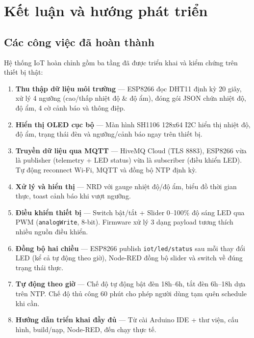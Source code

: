 \documentclass[13pt,a4paper]{article}
\newcommand{\code}[1]{\texttt{#1}}
\begin{document}
\section{Kết luận và hướng phát triển}
\label{sec:ketluan}

\subsection{Các công việc đã hoàn thành}
\label{sec:hoanthanh}

Hệ thống IoT hoàn chỉnh gồm ba tầng đã được triển khai và kiểm chứng trên thiết bị thật:

\begin{enumerate}[label=\arabic*., leftmargin=1.5cm]
    \item \textbf{Thu thập dữ liệu môi trường} --- ESP8266 đọc DHT11 định kỳ 20 giây, xử lý 4 ngưỡng (cao/thấp nhiệt độ \& độ ẩm), đóng gói JSON chứa nhiệt độ, độ ẩm, 4 cờ cảnh báo và thông điệp.
    \item \textbf{Hiển thị OLED cục bộ} --- Màn hình SH1106 128x64 I2C hiển thị nhiệt độ, độ ẩm, trạng thái đèn và ngưỡng/cảnh báo ngay trên thiết bị.
    \item \textbf{Truyền dữ liệu qua MQTT} --- HiveMQ Cloud (TLS 8883), ESP8266 vừa là publisher (telemetry + LED status) vừa là subscriber (điều khiển LED). Tự động reconnect Wi-Fi, MQTT và đồng bộ NTP định kỳ.
    \item \textbf{Xử lý và hiển thị} --- NRD với gauge nhiệt độ/độ ẩm, biểu đồ thời gian thực, toast cảnh báo khi vượt ngưỡng.
    \item \textbf{Điều khiển thiết bị} --- Switch bật/tắt + Slider 0--100\% độ sáng LED qua PWM (\code{analogWrite}, 8-bit). Firmware xử lý 3 dạng payload tương thích nhiều nguồn điều khiển.
    \item \textbf{Đồng bộ hai chiều} --- ESP8266 publish \code{iot/led/status} sau mỗi thay đổi LED (kể cả tự động theo giờ), Node-RED đồng bộ slider và switch về đúng trạng thái thực.
    \item \textbf{Tự động theo giờ} --- Chế độ tự động bật đèn 18h--6h, tắt đèn 6h--18h dựa trên NTP. Chế độ thủ công 60 phút cho phép người dùng tạm quên schedule khi cần.
    \item \textbf{Hướng dẫn triển khai đầy đủ} --- Từ cài Arduino IDE + thư viện, cấu hình, build/nạp, Node-RED, đến chạy thực tế.
\end{enumerate}
\end{document}
